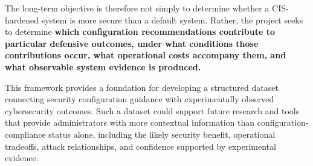 \documentclass[11pt]{article}
\begin{document}
The long-term objective is therefore not simply to determine whether a
CIS-hardened system is more secure than a default system. Rather, the
project seeks to determine \textbf{which configuration recommendations
contribute to particular defensive outcomes, under what conditions those
contributions occur, what operational costs accompany them, and what
observable system evidence is produced.}

This framework provides a foundation for developing a structured dataset
connecting security configuration guidance with experimentally observed
cybersecurity outcomes. Such a dataset could support future research and
tools that provide administrators with more contextual information than
configuration-compliance status alone, including the likely security
benefit, operational tradeoffs, attack relationships, and confidence
supported by experimental evidence.
\end{document}
